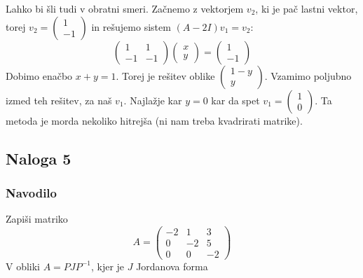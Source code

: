 \documentclass{article}
\begin{document}
\noindent
Lahko bi šli tudi v obratni smeri.
Začnemo z vektorjem $v_2$, ki je pač lastni vektor, torej $v_2 = \begin{pmatrix} 1 \\ -1 \end{pmatrix}$ in rešujemo sistem $(A-2I)v_1 = v_2$:
\begin{equation*}
\begin{pmatrix}
1 & 1 \\
-1 & -1
\end{pmatrix}
\begin{pmatrix} x \\ y \end{pmatrix}
=
\begin{pmatrix} 1 \\ -1 \end{pmatrix}
\end{equation*}
Dobimo enačbo $x+y=1$. Torej je rešitev oblike $\begin{pmatrix} 1-y \\ y \end{pmatrix}$. Vzamimo poljubno izmed teh rešitev, za naš $v_1$. Najlažje kar $y=0$ kar da spet $v_1 = \begin{pmatrix} 1 \\ 0 \end{pmatrix}$.
\noindent
Ta metoda je morda nekoliko hitrejša (ni nam treba kvadrirati matrike).

\subsection*{Naloga 5}
\subsubsection*{Navodilo}
Zapiši matriko
\begin{equation*}
A = 
\begin{pmatrix}
-2 & 1 & 3 \\
0 & -2 & 5 \\
0 & 0 & -2
\end{pmatrix}
\end{equation*}
V obliki $A = P J P^{-1}$, kjer je $J$ Jordanova forma
\end{document}
